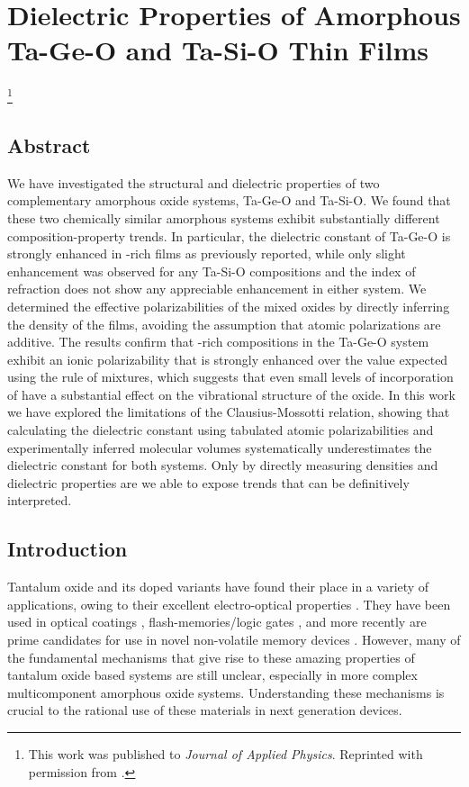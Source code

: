 \chapter{Dielectric Properties of Amorphous Ta-Ge-O and Ta-Si-O Thin Films}

{\let\thefootnote\relax\footnote{{
This work was published to \emph{Journal of Applied Physics}. Reprinted with permission from \cite{Naoi2018jap}.
}}}

\section{Abstract}
We have investigated the structural and dielectric properties of two complementary amorphous oxide systems, Ta-Ge-O and Ta-Si-O. We found that these two chemically similar amorphous systems exhibit substantially different composition-property trends. In particular, the dielectric constant of Ta-Ge-O is strongly enhanced in -rich films as previously reported, while only slight enhancement was observed for any Ta-Si-O compositions and the index of refraction does not show any appreciable enhancement in either system. We determined the effective polarizabilities of the mixed oxides by directly inferring the density of the films, avoiding the assumption that atomic polarizations are additive. The results confirm that -rich compositions in the Ta-Ge-O system exhibit an ionic polarizability that is strongly enhanced over the value expected using the rule of mixtures, which suggests that even small levels of incorporation of  have a substantial effect on the vibrational structure of the oxide. In this work we have explored the limitations of the Clausius-Mossotti relation, showing that calculating the dielectric constant using tabulated atomic polarizabilities and experimentally inferred molecular volumes systematically underestimates the dielectric constant for both systems. Only by directly measuring densities and dielectric properties are we able to expose trends that can be definitively interpreted.

\section{Introduction} 
Tantalum oxide and its doped variants have found their place in a variety of applications, owing to their excellent electro-optical properties \cite{Chaneliere1998}. They have been used in optical coatings \cite{Harry2002}, flash-memories/logic gates \cite{Kingon2000}, and more recently are prime candidates for use in novel non-volatile memory devices \cite{Lee2011a}. However, many of the fundamental mechanisms that give rise to these amazing properties of tantalum oxide based systems are still unclear, especially in more complex multicomponent amorphous oxide systems. Understanding these mechanisms is crucial to the rational use of these materials in next generation devices.

